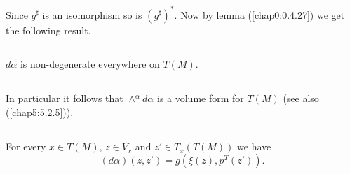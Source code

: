 Since $g^{\sharp}$ is an isomorphism so is $(g^{\sharp})^{\ast}$. Now
by lemma (\ref{chap0:0.4.27}) we get the following result.

\subsection{}\label{chap3:3.6.8}

\begin{prop*}
$d\alpha$ is non-degenerate everywhere on $T(M)$.
\end{prop*}

\setcounter{subsection}{8}
\subsection{}\label{chap3:3.6.9}
In particular it follows that
${\displaystyle{\mathop{\wedge}^{\alpha}}}d\alpha$ is a volume form for
  $T(M)$ (see also (\ref{chap5:5.2.5})).

\subsection{}\label{chap3:3.6.10}


\begin{lemma*}
For every $x\in T(M)$, $z\in V_{x}$ and $z'\in T_{x}(T(M))$ we have
$$
(d\alpha)(z,z')=g(\xi(z),p^{T}(z')).
$$
\end{lemma*}

